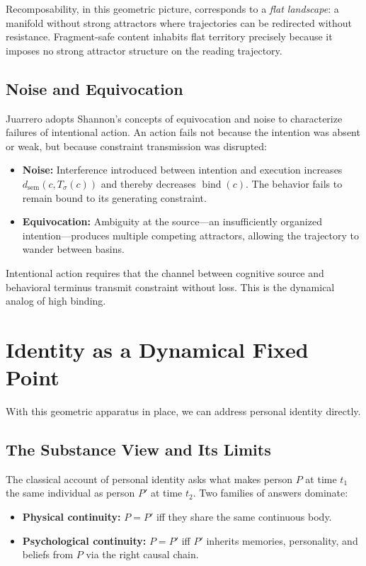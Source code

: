 \documentclass[11pt]{article}
\newcommand{\bind}{\operatorname{bind}}
\newcommand{\dsem}{d_{\mathrm{sem}}}
\begin{document}
Recomposability, in this geometric picture, corresponds to a \emph{flat landscape}: a
manifold without strong attractors where trajectories can be redirected without
resistance. Fragment-safe content inhabits flat territory precisely because it imposes no
strong attractor structure on the reading trajectory.

\subsection{Noise and Equivocation}

Juarrero adopts Shannon's concepts of equivocation and noise to characterize failures of
intentional action. An action fails not because the intention was absent or weak, but
because constraint transmission was disrupted:

\begin{itemize}
  \item \textbf{Noise:} Interference introduced between intention and execution increases
        $\dsem(c, T_\sigma(c))$ and thereby decreases $\bind(c)$. The behavior fails to
        remain bound to its generating constraint.
  \item \textbf{Equivocation:} Ambiguity at the source—an insufficiently organized
        intention—produces multiple competing attractors, allowing the trajectory to
        wander between basins.
\end{itemize}

Intentional action requires that the channel between cognitive source and behavioral
terminus transmit constraint without loss. This is the dynamical analog of high binding.

\section{Identity as a Dynamical Fixed Point}

With this geometric apparatus in place, we can address personal identity directly.

\subsection{The Substance View and Its Limits}

The classical account of personal identity asks what makes person $P$ at time $t_1$ the
same individual as person $P'$ at time $t_2$. Two families of answers dominate:

\begin{itemize}
  \item \textbf{Physical continuity:} $P = P'$ iff they share the same continuous body.
  \item \textbf{Psychological continuity:} $P = P'$ iff $P'$ inherits memories,
        personality, and beliefs from $P$ via the right causal chain.
\end{itemize}
\end{document}
